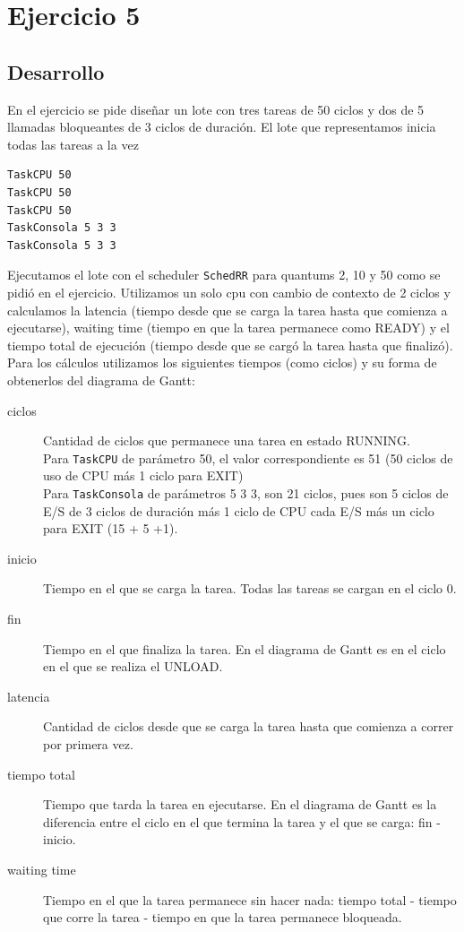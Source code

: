 \section{Ejercicio 5}


\subsection{Desarrollo}
En el ejercicio se pide diseñar un lote con tres tareas de 50 ciclos y dos de 5 llamadas bloqueantes de 3 ciclos de duración. El lote que representamos inicia todas las tareas a la vez
\begin{verbatim}
TaskCPU 50
TaskCPU 50
TaskCPU 50
TaskConsola 5 3 3
TaskConsola 5 3 3
\end{verbatim}
Ejecutamos el lote con el scheduler \verb|SchedRR| para quantums 2, 10 y 50 como se pidió en el ejercicio. Utilizamos un solo cpu con cambio de contexto de 2 ciclos y  calculamos la latencia (tiempo desde que se carga la tarea hasta que comienza a ejecutarse), waiting time (tiempo en que la tarea permanece como READY) y el tiempo total de ejecución (tiempo desde que se cargó la tarea hasta que finalizó).  Para los cálculos utilizamos los siguientes tiempos (como ciclos) y su forma de obtenerlos del diagrama de Gantt:
\begin{description}
\item[ciclos] Cantidad de ciclos que permanece una tarea en estado RUNNING.\\
Para \verb|TaskCPU| de parámetro 50, el valor correspondiente es 51 (50 ciclos de uso de CPU más 1 ciclo para EXIT)\\
Para \verb|TaskConsola| de parámetros 5 3 3, son 21 ciclos, pues son 5 ciclos de E/S de 3 ciclos de duración más 1 ciclo de CPU cada E/S más un ciclo para EXIT (15 + 5 +1).
\item[inicio] Tiempo en el que se carga la tarea. Todas las tareas se cargan en el ciclo 0.
\item[fin] Tiempo en el que finaliza la tarea. En el diagrama de Gantt es en el ciclo en el que se realiza el UNLOAD.
\item[latencia] Cantidad de ciclos desde que se carga la tarea hasta que comienza a correr por primera vez.
\item[tiempo total] Tiempo que tarda la tarea en ejecutarse. En el diagrama de Gantt es la diferencia entre el ciclo en el que termina la tarea y el que se carga: fin - inicio.
\item[waiting time] Tiempo en el que la tarea permanece sin hacer nada: tiempo total - tiempo que corre la tarea - tiempo en que la tarea permanece bloqueada.
\end{description}
